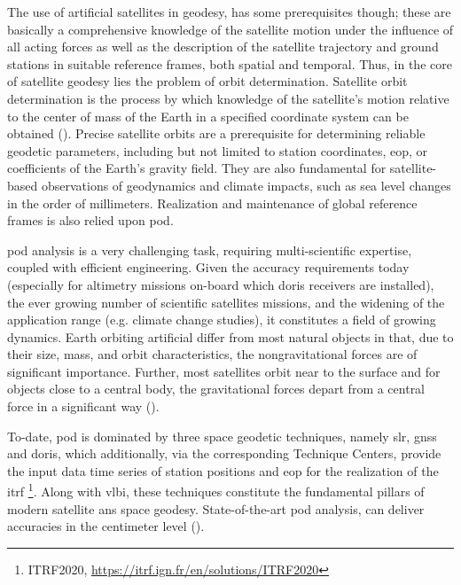 The use of artificial satellites in geodesy, has
some prerequisites though; these are basically a comprehensive knowledge of the satellite
motion under the influence of all acting forces as well as the description of the satellite
trajectory and ground stations in suitable reference frames, both spatial and temporal.
Thus, in the core of satellite geodesy lies the problem of orbit determination. Satellite
orbit determination is the process by which knowledge of the satellite’s
motion relative to the center of mass of the Earth in a specified coordinate system can be
obtained (\cite{Tapley2004}). Precise satellite orbits are a prerequisite for determining
reliable geodetic parameters, including but not limited to station coordinates, \gls{eop},
or coefficients of the Earth's gravity field. They are also fundamental for satellite-based
observations of geodynamics and climate impacts, such as sea level changes in the order of
millimeters. Realization and maintenance of global reference frames is also relied upon
\gls{pod}.

\gls{pod} analysis is a very challenging task, requiring multi-scientific expertise,
coupled with efficient engineering. Given the accuracy requirements today (especially
for altimetry missions on-board which \gls{doris} receivers are installed), the
ever growing number of scientific satellites missions, and the widening of the application
range (e.g. climate change studies), it constitutes a field of growing dynamics.
Earth orbiting artificial differ from most natural objects in that, due to their size, mass,
and orbit characteristics, the nongravitational forces are of significant importance.
Further, most satellites orbit near to the surface and for objects close to a central
body, the gravitational forces depart from a central force in a significant way
(\cite{Tapley2004}).

To-date, \gls{pod} is dominated by three space geodetic techniques, namely \gls{slr}, \gls{gnss} and
\gls{doris}, which additionally, via the corresponding Technique Centers, provide the input
data time series of station positions and \gls{eop} for the realization of the \gls{itrf}
\footnote{ITRF2020, \url{https://itrf.ign.fr/en/solutions/ITRF2020}}. Along with \gls{vlbi}, these
techniques constitute the fundamental pillars of modern satellite ans space geodesy.
State-of-the-art \gls{pod} analysis, can deliver accuracies in the centimeter level
(\cite{Rudenko2023}).

